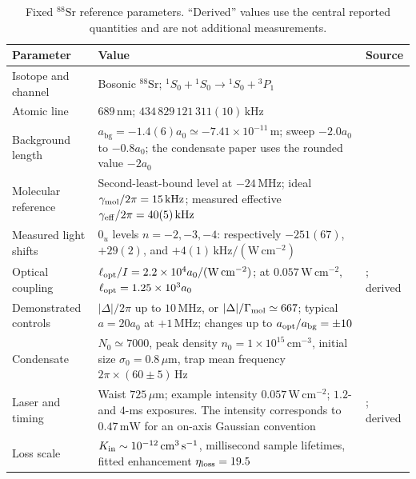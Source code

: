 \documentclass[9pt,a4paper,twocolumn,twoside]{rho-class/rho}
\newcommand{\abg}{a_{\mathrm{bg}}}
\begin{document}
        \begin{table}[t]
            \caption{Fixed $^{88}\mathrm{Sr}$ reference parameters. ``Derived'' values use the central reported quantities and are not additional measurements.}
            \label{tab:experimental-parameters}
            \setlength{\tabcolsep}{5pt}
            \begin{tabular}{>{\raggedright\arraybackslash}p{}>{\raggedright\arraybackslash}p{}>{\raggedright\arraybackslash}p{}}
                \toprule
                \textbf{Parameter} & \textbf{Value} & \textbf{Source} \\
                \midrule
                Isotope and channel & Bosonic $^{88}\mathrm{Sr}$; $^1S_0+{}^1S_0\rightarrow{}^1S_0+{}^3P_1$ & \cite{blatt2011measurement,yan2013controlling} \\
                Atomic line & $689\,\mathrm{nm}$; $434\,829\,121\,311(10)\,\mathrm{kHz}$ & \cite{ferrari2003precision} \\
                Background length & $\abg=-1.4(6)a_0\simeq-7.41\times10^{-11}\,\mathrm{m}$; sweep $-2.0a_0$ to $-0.8a_0$; the condensate paper uses the rounded value $-2a_0$ & \cite{blatt2011measurement,yan2013controlling} \\
                Molecular reference & Second-least-bound level at $-24\,\mathrm{MHz}$; ideal $\gamma_{\rm mol}/2\pi=15\,\mathrm{kHz}$; measured effective $\gamma_{\rm eff}/2\pi=40(5)\,\mathrm{kHz}$ & \cite{blatt2011measurement,yan2013controlling} \\
                Measured light shifts & $0_u$ levels $n=-2,-3,-4$: respectively $-251(67)$, $+29(2)$, and $+4(1)\,\mathrm{kHz}/(\mathrm{W\,cm^{-2}})$ & \cite{blatt2011measurement} \\
                Optical coupling & $\ell_{\rm opt}/I=2.2\times10^4a_0/(\mathrm{W\,cm^{-2}})$; at $0.057\,\mathrm{W\,cm^{-2}}$, $\ell_{\rm opt}=1.25\times10^3a_0$ & \cite{yan2013controlling}; derived \\
                Demonstrated controls & $|\Delta|/2\pi$ up to $10\,\mathrm{MHz}$, or $|\Delta|/\Gamma_{\rm mol}\simeq667$; typical $a=20a_0$ at $+1\,\mathrm{MHz}$; changes up to $a_{\rm opt}/\abg=\pm10$ & \cite{yan2013controlling} \\
                Condensate & $N_0\simeq7000$, peak density $n_0=1\times10^{15}\,\mathrm{cm^{-3}}$, initial size $\sigma_0=0.8\,\mu\mathrm{m}$, trap mean frequency $2\pi\times(60\pm5)\,\mathrm{Hz}$ & \cite{yan2013controlling} \\
                Laser and timing & Waist $725\,\mu\mathrm{m}$; example intensity $0.057\,\mathrm{W\,cm^{-2}}$; $1.2$- and $4$-ms exposures. The intensity corresponds to $0.47\,\mathrm{mW}$ for an on-axis Gaussian convention & \cite{yan2013controlling}; derived \\
                Loss scale & $K_{\rm in}\sim10^{-12}\,\mathrm{cm^3\,s^{-1}}$, millisecond sample lifetimes, fitted enhancement $\eta_{\rm loss}=19.5$ & \cite{yan2013controlling} \\
                \bottomrule
            \end{tabular}
        \end{table}
\end{document}
